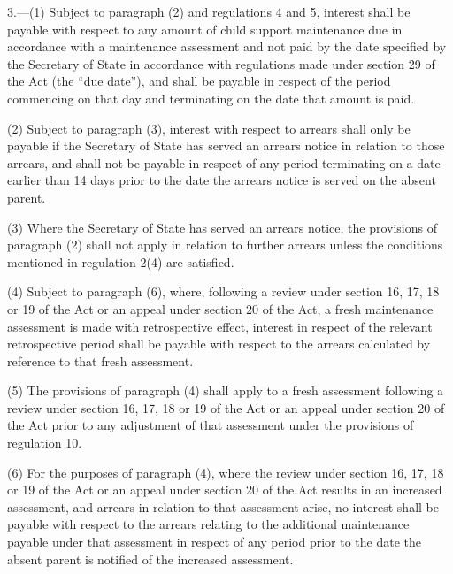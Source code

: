 \documentclass[12pt,a4paper]{article}
\begin{document}
3.—(1) Subject to paragraph (2) and regulations 4 and 5, interest shall be payable with respect to any amount of child support maintenance due in accordance with a maintenance assessment and not paid by the date specified by the Secretary of State in accordance with regulations made under section 29 of the Act (the “due date”), and shall be payable in respect of the period commencing on that day and terminating on the date that amount is paid.

(2) Subject to paragraph (3), interest with respect to arrears shall only be payable if the Secretary of State has served an arrears notice in relation to those arrears, and shall not be payable in respect of any period terminating on a date earlier than 14 days prior to the date the arrears notice is served on the absent parent.

(3) Where the Secretary of State has served an arrears notice, the provisions of paragraph (2) shall not apply in relation to further arrears unless the conditions mentioned in regulation 2(4) are satisfied.

(4) Subject to paragraph (6), where, following a review under section 
16, 17, %
18 or 19 of the Act or an appeal under section 20 of the Act, a fresh maintenance assessment is made with retrospective effect, interest in respect of the relevant retrospective period shall be payable with respect to the arrears calculated by reference to that fresh assessment.

(5) The provisions of paragraph (4) shall apply to a fresh assessment following a review under section 
16, 17, %
18 or 19 of the Act or an appeal under section 20 of the Act prior to any adjustment of that assessment under the provisions of regulation 10.

(6) For the purposes of paragraph (4), where the review under section 
16, 17, %
18 or 19 of the Act or an appeal under section 20 of the Act results in an increased assessment, and arrears in relation to that assessment arise, no interest shall be payable with respect to the arrears relating to the additional maintenance payable under that assessment in respect of any period prior to the date the absent parent is notified of the increased assessment.

\end{document}
